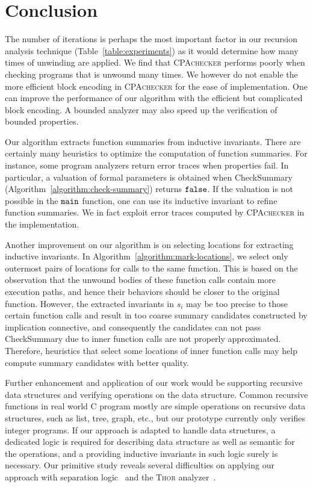 
\chapter{Conclusion}\label{ch:conclusion}


The number of iterations is perhaps the most important factor in our
recursion analysis technique (Table~\ref{table:experiments}) as it would
determine how many times of unwinding are applied.
We find that \textsc{CPAchecker} performs poorly when checking programs
that is unwound many times.
We however do not enable the more efficient block encoding in
\textsc{CPAchecker} for the ease of implementation.
One can improve the performance of our algorithm with the efficient but
complicated block encoding.
A bounded analyzer may also speed up the verification of bounded properties.

Our algorithm extracts function summaries from inductive invariants.
There are certainly many heuristics to optimize the computation of
function summaries.
For instance, some program analyzers return error traces when properties fail.
In particular, a valuation of formal parameters is obtained when
\textmd{CheckSummary} (Algorithm~\ref{algorithm:check-summary}) returns $\mathtt{false}$.
If the valuation is not possible in the $\mathtt{{main}}$ function, one can use
its inductive invariant to refine function summaries.
We in fact exploit error traces computed by \textsc{CPAchecker} in the
implementation.

Another improvement on our algorithm is on selecting locations for extracting
inductive invariants.
In Algorithm~\ref{algorithm:mark-locations}, we select only outermost pairs of
locations for calls to the same function.
This is based on the observation that the unwound bodies of these function calls
contain more execution paths,
and hence their behaviors should be closer to the original function.
However, the extracted invariants in $s_i$ may be too precise to those certain
function calls and result in too coarse summary candidates constructed by
implication connective,
and consequently the candidates can not pass \textmd{CheckSummary} due to inner
function calls are not properly approximated.
Therefore, heuristics that select some locations of inner function calls may help
compute summary candidates with better quality.

Further enhancement and application of our work would be supporting recursive
data structures and verifying operations on the data structure.
Common recursive functions in real world C program mostly are simple operations
on recursive data structures, such as list, tree, graph, etc.,
but our prototype currently only verifies integer programs.
If our approach is adapted to handle data structures, a dedicated logic is
required for describing data structure as well as semantic for the operations,
and a  providing inductive invariants in such logic surely
is necessary.
Our primitive study reveals several difficulties on applying our approach with
separation logic~\cite{Reynolds02} and the \textsc{Thor}
analyzer~\cite{MagillTLT08}.

